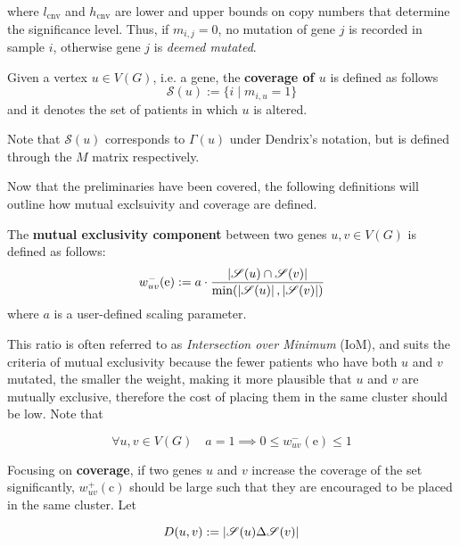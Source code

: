 where $l_{\mathrm{cnv}}$ and $h_{\mathrm{cnv}}$ are lower and upper bounds on copy numbers that determine the significance level. Thus, if $m_{i, j} = 0$, no mutation of gene $j$ is recorded in sample $i$, otherwise gene $j$ is \textit{deemed mutated}.

\begin{definition}
    Given a vertex $u \in V(G)$, i.e. a gene, the \textbf{coverage of $u$} is defined as follows $$\mathscr{S}(u) := \{i \mid m_{i, u} = 1\}$$ and it denotes the set of patients in which $u$ is altered.
\end{definition}

Note that $\mathscr{S}(u)$ corresponds to $\Gamma(u)$ under Dendrix's notation, but is defined through the $M$ matrix respectively.

Now that the preliminaries have been covered, the following definitions will outline how mutual exclsuivity and coverage are defined.

\begin{definition} \label{me_comp}
    The \textbf{mutual exclusivity component} between two genes $u, v \in V(G)$ is defined as follows: $$w_{uv}^-(\mathrm e) := a \cdot \dfrac{\left|\mathscr{S}(u) \cap \mathscr{S}(v)\right|}{\min(\left|\mathscr{S}(u)\right|, \left|\mathscr{S}(v)\right|)}$$ where $a$ is a user-defined scaling parameter.
\end{definition}

This ratio is often referred to as \textit{Intersection over Minimum} (IoM), and suits the criteria of mutual exclusivity because the fewer patients who have both $u$ and $v$ mutated, the smaller the weight, making it more plausible that $u$ and $v$ are mutually exclusive, therefore the cost of placing them in the same cluster should be low. Note that

\begin{equation}\label{neg_weight_constraint}
    \forall u, v \in V(G) \quad a = 1 \implies 0 \le w_{uv}^-(\mathrm e) \le 1
\end{equation}

Focusing on \textbf{coverage}, if two genes $u$ and $v$ increase the coverage of the set significantly, $w_{uv}^+(\mathrm c)$ should be large such that they are encouraged to be placed in the same cluster. Let

\begin{equation}
    D(u, v) := \left|\mathscr{S}(u) \Delta \mathscr{S}(v)\right|
\end{equation}

